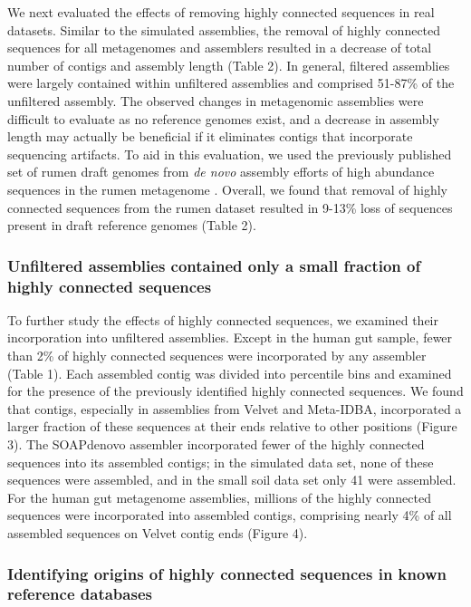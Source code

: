 \documentclass[10pt]{article}
\begin{document}
We next evaluated the effects of removing highly connected sequences in
real datasets.  Similar to the simulated assemblies, the
removal of highly connected sequences for all metagenomes and
assemblers resulted in a decrease of total number of contigs and assembly
length (Table 2).  In general, filtered assemblies were largely
contained within unfiltered assemblies and comprised 51-87\% of the
unfiltered assembly.  The observed changes in metagenomic assemblies
were difficult to evaluate as no reference genomes exist, 
and a decrease in assembly length may actually be beneficial if it
eliminates contigs that incorporate sequencing artifacts.
To aid in this evaluation, we used the previously published set of
rumen draft genomes from \emph{de novo} assembly efforts of high
abundance sequences in the rumen metagenome \cite{Hess:2011p686}.
Overall, we found that removal of highly connected sequences from the
rumen dataset resulted in 9-13\% loss of sequences present in
draft reference genomes (Table 2).


\subsubsection*{Unfiltered assemblies contained only a small fraction of highly connected sequences}

To further study the effects of highly connected sequences, we
examined their incorporation into unfiltered assemblies.  Except in
the human gut sample, fewer than 2\% of highly connected sequences
were incorporated by any assembler (Table 1).  Each assembled
contig was divided into percentile bins and examined for the
presence of the previously identified highly connected sequences.  We
found that contigs, especially in assemblies from Velvet and
Meta-IDBA, incorporated a larger fraction of these sequences at their
ends relative to other positions (Figure 3).  The SOAPdenovo
assembler incorporated fewer of the highly connected sequences into
its assembled contigs; in the simulated data set, none of these sequences
were assembled, and in the small soil data set only 41 were assembled.  For
the human gut metagenome assemblies, millions of the highly connected
sequences were incorporated into assembled contigs, comprising nearly
4\% of all assembled sequences on Velvet contig ends (Figure 4).

\subsubsection*{Identifying origins of highly connected sequences in known reference databases}
\end{document}
